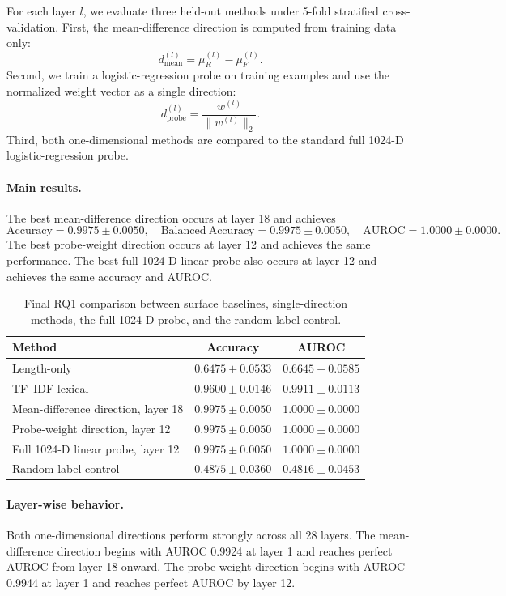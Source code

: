 \documentclass[11pt]{article}
\begin{document}
For each layer \(l\), we evaluate three held-out methods under 5-fold stratified cross-validation. First, the mean-difference direction is computed from training data only:
\[
d_{\mathrm{mean}}^{(l)} = \mu_R^{(l)} - \mu_F^{(l)}.
\]
Second, we train a logistic-regression probe on training examples and use the normalized weight vector as a single direction:
\[
d_{\mathrm{probe}}^{(l)} = \frac{w^{(l)}}{\|w^{(l)}\|_2}.
\]
Third, both one-dimensional methods are compared to the standard full 1024-D logistic-regression probe.

\paragraph{Main results.}
The best mean-difference direction occurs at layer 18 and achieves
\[
\mathrm{Accuracy}=0.9975 \pm 0.0050,\quad
\mathrm{Balanced\ Accuracy}=0.9975 \pm 0.0050,\quad
\mathrm{AUROC}=1.0000 \pm 0.0000.
\]
The best probe-weight direction occurs at layer 12 and achieves the same performance. The best full 1024-D linear probe also occurs at layer 12 and achieves the same accuracy and AUROC.

\begin{table}[H]
    \centering
    \begin{tabular}{lcc}
        \toprule
        Method & Accuracy & AUROC \\
        \midrule
        Length-only & \(0.6475 \pm 0.0533\) & \(0.6645 \pm 0.0585\) \\
        TF--IDF lexical & \(0.9600 \pm 0.0146\) & \(0.9911 \pm 0.0113\) \\
        Mean-difference direction, layer 18 & \(0.9975 \pm 0.0050\) & \(1.0000 \pm 0.0000\) \\
        Probe-weight direction, layer 12 & \(0.9975 \pm 0.0050\) & \(1.0000 \pm 0.0000\) \\
        Full 1024-D linear probe, layer 12 & \(0.9975 \pm 0.0050\) & \(1.0000 \pm 0.0000\) \\
        Random-label control & \(0.4875 \pm 0.0360\) & \(0.4816 \pm 0.0453\) \\
        \bottomrule
    \end{tabular}
    \caption{Final RQ1 comparison between surface baselines, single-direction methods, the full 1024-D probe, and the random-label control.}
    \label{tab:rq1-final-baseline-comparison}
\end{table}

\paragraph{Layer-wise behavior.}
Both one-dimensional directions perform strongly across all 28 layers. The mean-difference direction begins with AUROC 0.9924 at layer 1 and reaches perfect AUROC from layer 18 onward. The probe-weight direction begins with AUROC 0.9944 at layer 1 and reaches perfect AUROC by layer 12.
\end{document}
